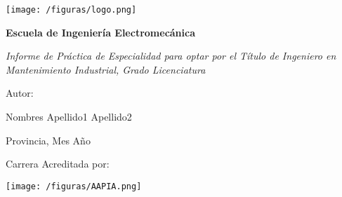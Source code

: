 \begin{titlepage}

\centering

{\texttt{[image: /figuras/logo.png]}\par}
\vspace{0.5cm}

{\bfseries\LARGE Escuela de Ingeniería Electromecánica\par}
\vspace{0.5cm}



\vfill

{\scshape\LARGE \lipsum[4][1-3] \par}
\vspace{1cm}

{\itshape\Large Informe de Práctica de Especialidad para optar por el Título de
Ingeniero en Mantenimiento Industrial, Grado Licenciatura \par}
\vspace{1cm}

{\Large Autor: \par}
{\Large Nombres Apellido1 Apellido2  \par}
\vspace{0.6cm}

{\Large Provincia, Mes Año \par}

\vspace{0.5cm}

{\Large Carrera Acreditada por: \par}
{\texttt{[image: /figuras/AAPIA.png]}\par}



\end{titlepage}
